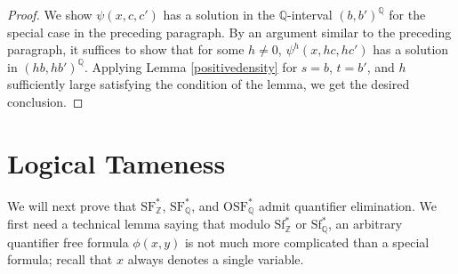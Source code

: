 \documentclass[letterpaper]{amsart}
\newcommand{\qq}{\mathbb{Q}}
\newcommand{\rr}{\mathbb{R}}
\newcommand{\nn}{\mathbb{N}}
\newcommand{\zz}{\mathbb{Z}}
\newcommand{\sU}{\mathscr{U}}
\newcommand{\sP}{\mathscr{P}}
\newcommand{\TSFZ}{\mathrm{SF}^*_{\zz}}
\newcommand{\TSFQ}{\mathrm{SF}^*_{\qq}}
\newcommand{\TOSFQ}{\mathrm{OSF}^*_{\qq}}
\newcommand{\WSFZ}{\mathrm{Sf}^*_{\zz}}
\newcommand{\WSFQ}{\mathrm{Sf}^*_{\qq}}
\begin{document}
\begin{proof}
We show $\psi(x, c, c')$ has a solution in the $\qq$-interval $(b, b')^\qq$ for the special case in the preceding paragraph. By an argument similar to the preceding paragraph, it suffices to show that for some $h\neq 0$, $\psi^h(x, hc, hc')$ has a solution in $(hb, hb')^\qq$. Applying Lemma \ref{positivedensity} for $s =b$, $t=b'$, and $h$ sufficiently large satisfying the condition of the lemma, we get the desired conclusion.
\begin{comment}
By Lemma \ref{positivedensity}, there is $N\in \nn^{>0}$ such that for all $h\neq 0 $ with $\mathrm{gcd}(h,N!)=1$, we get $\varepsilon \in (0,1)$, $C\in \rr$ independent of $h$ such that if 
$$\Psi^h(hs,ht) = \{ a \in \zz: \psi^h(a,hc,hc') \text{ holds and } hs<a<ht\}$$ 
with $s,t \in \rr^{>0}$, then
$$|\Psi^h(hs,ht)| \geq \varepsilon h(t-s) - \sqrt{h}\left(\sum_{i=1}^{n}\sqrt{|ks+c_i|} + \sqrt{|kt+c_i|}\right)  + C. $$ 
We get $h\in\zz^{>0}$ such that $\mathrm{gcd}(h,N!)=1$ and 
$$\varepsilon h(t-s) - \sqrt{h}\left(\sum_{i=1}^{n}\sqrt{|ks+c_i|} + \sqrt{|kt+c_i|}\right)  + C \geq 1.$$ 
We note that this means that there exists $a\in \zz$ such that $\psi^h(a,hc,hc')$ holds with $a\in[hs,ht]^{\qq}$. This of course means that $\psi(h^{-1}a,c,c')$ as $\sU^\zz$ and $\sP^\zz$ are precisely the restrictions of $\sU^\qq$ and $\sP^\qq$ to $\zz$ repectively $h^{-1}a \in [s,t]^{\qq}$. Therefore, we have the conclusion.
\end{comment}
\end{proof}



\section{Logical Tameness}
\noindent We will next prove that $\TSFZ$, $\TSFQ$, and $\TOSFQ$ admit quantifier elimination. We first need a technical lemma saying that modulo  $\WSFZ$ or $\WSFQ$, an arbitrary quantifier free formula $\phi(x,y)$ is not much more complicated than a special formula; recall that $x$ always denotes a single variable. 
\end{document}

